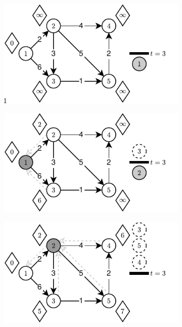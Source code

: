 \begin{figure}[!htbp]
	\centering
	\begin{subfigure}[b]{0.32\textwidth}
		\includegraphics[width=\textwidth]{Chapter_III/THRESHOLD-Example/a.pdf}
		\caption{}
	\end{subfigure}
	\begin{subfigure}[b]{0.32\textwidth}
		\includegraphics[width=\textwidth]{Chapter_III/THRESHOLD-Example/b.pdf}
		\caption{}
	\end{subfigure}
	\begin{subfigure}[b]{0.32\textwidth}
		\includegraphics[width=\textwidth]{Chapter_III/THRESHOLD-Example/c.pdf}

\end{subfigure}
\end{figure}
